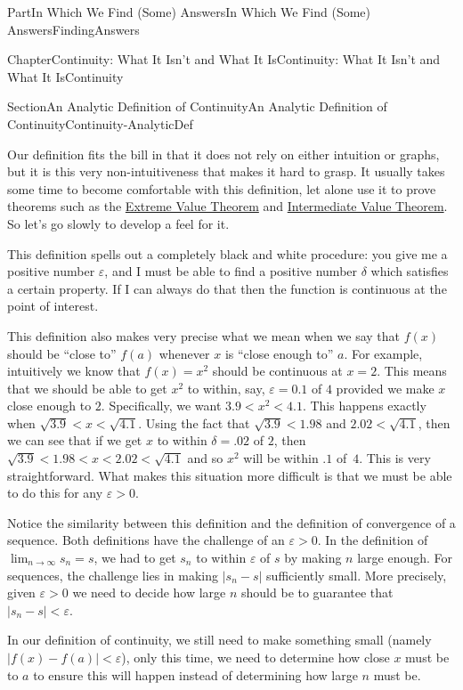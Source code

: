\documentclass[oneside,10pt,]{book}
\numberwithin{equation}{part}
\newcommand{\abs}[1]{\left|#1\right|}
\def\limit#1#2#3{{\displaystyle\lim_{#1\rightarrow #2}#3}}
\newcommand{\eps}{\varepsilon}
\newcommand{\lt}{<}
\begin{document}
\begin{partptx}{Part}{In Which We Find (Some) Answers}{}{In Which We Find (Some) Answers}{}{}{FindingAnswers}
\begin{chapterptx}{Chapter}{Continuity: What It Isn't and What It Is}{}{Continuity: What It Isn't and What It Is}{}{}{Continuity}
\begin{sectionptx}{Section}{An Analytic Definition of Continuity}{}{An Analytic Definition of Continuity}{}{}{Continuity-AnalyticDef}
\par
{} Our definition fits the bill in that it does not rely on either intuition or graphs, but it is this very non-intuitiveness that makes it hard to grasp.  It usually takes some time to become comfortable with this definition, let alone use it to prove theorems such as the \hyperref[thm_EVT]{Extreme Value Theorem} and \hyperref[IntermediateValueTheorem]{Intermediate Value Theorem}.  So let's go slowly to develop a feel for it.%
\par
This definition spells out a completely black and white procedure: you give me a positive number \(\eps\), and I must be able to find a positive number \(\delta\) which satisfies a certain property.  If I can always do that then the function is continuous at the point of interest.%
\par
This definition also makes very precise what we mean when we say that \(f(x)\) should be ``close to'' \(f(a)\) whenever \(x\) is ``close enough to'' \(a\).  For example, intuitively we know that \(f(x)=x^2\) should be continuous at \(x=2\).  This means that we should be able to get \(x^2\) to within, say, \(\eps=0.1\) of \(4\) provided we make \(x\) close enough to \(2\).  Specifically, we want \(3.9\lt x^2\lt 4.1\).  This happens exactly when \(\sqrt{3.9}\lt x\lt \sqrt{4.1}\).  Using the fact that \(\sqrt{3.9}\lt 1.98\) and \(2.02\lt \sqrt{4.1}\), then we can see that if we get \(x\) to within \(\delta=.02\) of \(2\), then \(\sqrt{3.9}\lt 1.98\lt x\lt 2.02\lt
\sqrt{4.1}\) and so \(x^2\) will be within .\(1\) of \(\,4\).  This is very straightforward.  What makes this situation more difficult is that we must be able to do this for any \(\eps>0\).%
\par
Notice the similarity between this definition and the definition of convergence of a sequence.  Both definitions have the challenge of an \(\eps>0\).  In the definition of \(\limit{n}{\infty}{s_n}=s\), we had to get \(s_n\) to within \(\eps\) of \(s\) by making \(n\) large enough.  For sequences, the challenge lies in making \(\abs{s_n-s}\) sufficiently small.  More precisely, given \(\eps>0\) we need to decide how large \(n\) should be to guarantee that \(\abs{s_n-s}\lt \eps\).%
\par
In our definition of continuity, we still need to make something small (namely \(\abs{f(x)-f(a)}\lt \eps\)), only this time, we need to determine how close \(x\) must be to \(a\) to ensure this will happen instead of determining how large \(n\) must be.%

\end{sectionptx}
\end{chapterptx}
\end{partptx}
\end{document}
